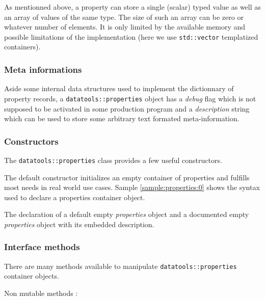 As mentionned above, a property can store a single (scalar) typed value
as well as an array of values of the same type. The size of such an array
can be zero or whatever number of elements. It is only limited
by the available memory and possible limitations of the implementation
(here we use \texttt{std::vector} templatized containers).

\subsubsection{Meta informations}

Aside some internal data structures used to implement the dictionnary
of property records, a \texttt{datatools::properties} object
has a \emph{debug} flag which is not supposed to be activated in some production
program and a \emph{description} string which can be used to store
some  arbitrary text formated meta-information.


\subsubsection{Constructors}

The \texttt{datatools::properties} class provides a few useful
constructors.

The default  constructor initializes an empty  container of properties
and   fulfills   most   needs   in   real world   use   cases.   Sample
\ref{sample:properties:0}   shows  the  syntax   used  to   declare  a
properties container object.

\begin{sample}[h]
\caption{The declaration of a default empty \emph{properties}
object and a documented empty \emph{properties}
object with its embedded description.}
\label{sample:properties:0}
\end{sample}


\subsubsection{Interface methods}

There     are     many     methods     available     to     manipulate
\texttt{datatools::properties} container objects.

\pn Non mutable methods :

